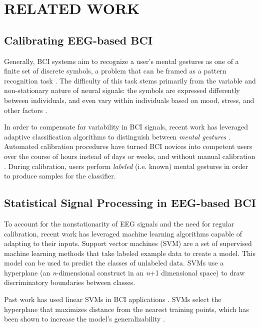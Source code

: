 \section{\uppercase{Related Work}}
\label{sec:related}

\subsection{Calibrating EEG-based BCI}

\noindent Generally, BCI systems aim to recognize a user's mental gestures as one of a finite set of discrete symbols, a problem that can be framed as a pattern recognition task \cite{lotte_review_2007}. The difficulty of this task stems primarily from the variable and non-stationary nature of neural signals: the symbols are expressed differently between individuals, and even vary within individuals based on mood, stress, and other factors \cite{vidaurre_machine-learning-based_2011}. 

In order to compensate for variability in BCI signals, recent work has leveraged adaptive classification algorithms to distinguish between \textit{mental gestures} \cite{lotte_review_2007,vidaurre_machine-learning-based_2011,friedrich2013whatever}. Automated calibration procedures have turned BCI novices into competent users over the course of hours instead of days or weeks, and without manual calibration \cite{vidaurre_machine-learning-based_2011}. During calibration, users perform \textit{labeled} (i.e. known) mental gestures in order to produce samples for the classifier.

\subsection{Statistical Signal Processing in EEG-based BCI}

To account for the nonstationarity of EEG signals and the need for regular calibration, recent work has leveraged machine learning algorithms capable of adapting to their inputs. Support vector machines (SVM) are a set of supervised machine learning methods that take labeled example data to create a model. This model can be used to predict the classes of unlabeled data. SVMs use a hyperplane (an \emph{n}-dimensional construct in an \emph{n}+1 dimensional space) to draw discriminatory boundaries between classes. 

Past work has used linear SVMs in BCI applications \cite{garrett_comparison_2003,grierson_better_2011}. SVMs select the hyperplane that maximizes distance from the nearest training points, which has been shown to increase the model's generalizability \cite{burges_tutorial_1998}. 

